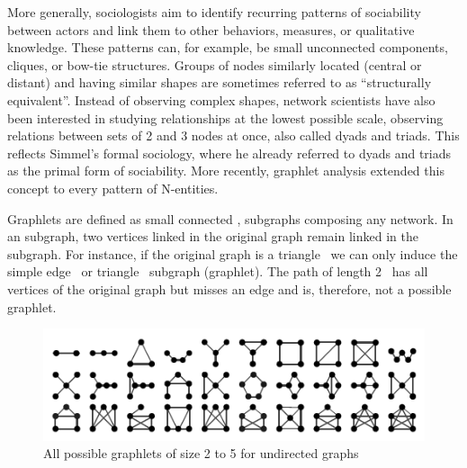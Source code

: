 More generally, sociologists aim to identify recurring patterns of sociability between actors and link them to other behaviors, measures, or qualitative knowledge.
These patterns can, for example, be small unconnected components, cliques, or bow-tie structures\cite{wassermanSocialNetworkAnalysis1994}.
Groups of nodes similarly located (central or distant) and having similar shapes are sometimes referred to as ``structurally equivalent''\cite{lemercier12FormalNetwork2015}.
Instead of observing complex shapes, network scientists have also been interested in studying relationships at the lowest possible scale, \ie observing relations between sets of 2 and 3 nodes at once, also called dyads and triads\cite{wassermanSocialNetworkAnalysis1994}.
This reflects Simmel's formal sociology, where he already referred to dyads and triads as the primal form of sociability\cite{Simmel2013}.
More recently, graphlet analysis extended this concept to every pattern of N-entities\cite{przuljBiologicalNetworkComparison2007}.

Graphlets are defined as small connected ,  subgraphs composing any network\cite{miloNetworkMotifsSimple2002}.
In an  subgraph, two vertices linked in the original graph remain linked in the subgraph.
For instance, if the original graph is a triangle \TRIANGLE\ we can only induce the simple edge \EDGE\ or triangle \TRIANGLE\ subgraph (graphlet).
The path of length 2 \PATH\ has all vertices of the original graph but misses an edge and is, therefore, not a possible graphlet.



\begin{figure}
    \centering %
    \includegraphics[width=1\textwidth]{static/figures/RelatedWork/all_graphlets_undir5}
    \caption{All possible graphlets of size 2 to 5 for undirected graphs}
    \label{fig:undir5-graphlets}
\end{figure}

